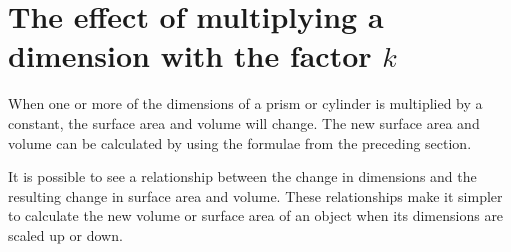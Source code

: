 \section[The effect of multiplying a dimension with the factor $k$]{\Huge The effect of multiplying a dimension with the factor $k$}
When one or more of the dimensions of a prism or cylinder is multiplied by a constant, the
surface area and volume will change. The new surface area and volume can be calculated by
using the formulae from the preceding section.\par
It is possible to see a relationship between the change in dimensions and the resulting change
in surface area and volume. These relationships make it simpler to
calculate the new volume or surface area of an object when its dimensions are
scaled up or down.\par

